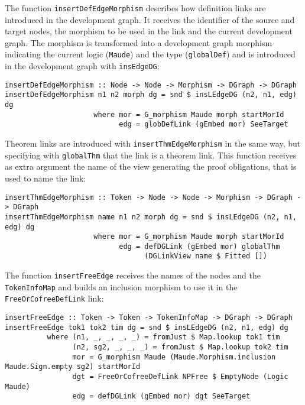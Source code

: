 The function \verb"insertDefEdgeMorphism" describes how definition links
are introduced in the
development graph. It receives the identifier of the source and target
nodes, the morphism to be used in the link and the current development
graph. The morphism is transformed into a development graph morphism
indicating the current logic (\verb"Maude") and the type (\verb"globalDef")
and is introduced in the development graph with \verb"insEdgeDG":

{\codesize
\begin{verbatim}
insertDefEdgeMorphism :: Node -> Node -> Morphism -> DGraph -> DGraph
insertDefEdgeMorphism n1 n2 morph dg = snd $ insLEdgeDG (n2, n1, edg) dg
                     where mor = G_morphism Maude morph startMorId
                           edg = globDefLink (gEmbed mor) SeeTarget
\end{verbatim}
}

Theorem links are introduced with \verb"insertThmEdgeMorphism"
in the same way, but specifying with
\verb"globalThm" that the link is a theorem link. This function receives
as extra argument the name of the view generating the proof obligations,
that is used to name the link:

{\codesize
\begin{verbatim}
insertThmEdgeMorphism :: Token -> Node -> Node -> Morphism -> DGraph -> DGraph
insertThmEdgeMorphism name n1 n2 morph dg = snd $ insLEdgeDG (n2, n1, edg) dg
                     where mor = G_morphism Maude morph startMorId
                           edg = defDGLink (gEmbed mor) globalThm
                                 (DGLinkView name $ Fitted [])
\end{verbatim}
}

The function \verb"insertFreeEdge" receives the names of the nodes and
the \verb"TokenInfoMap" and builds an inclusion morphism to use it in
the \verb"FreeOrCofreeDefLink" link:

{\codesize
\begin{verbatim}
insertFreeEdge :: Token -> Token -> TokenInfoMap -> DGraph -> DGraph
insertFreeEdge tok1 tok2 tim dg = snd $ insLEdgeDG (n2, n1, edg) dg
          where (n1, _, _, _, _) = fromJust $ Map.lookup tok1 tim
                (n2, sg2, _, _, _) = fromJust $ Map.lookup tok2 tim
                mor = G_morphism Maude (Maude.Morphism.inclusion Maude.Sign.empty sg2) startMorId
                dgt = FreeOrCofreeDefLink NPFree $ EmptyNode (Logic Maude)
                edg = defDGLink (gEmbed mor) dgt SeeTarget
\end{verbatim}
}























